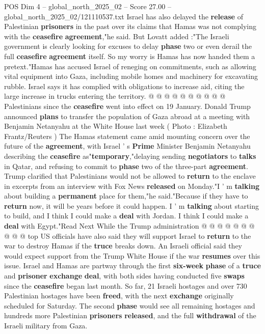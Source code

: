 \begin{textsample}{POS Dim 4 – global\_north\_2025\_02 – Score 27.00 – global\_north\_2025\_02/121110537.txt}
Israel has also delayed the \textbf{release} of Palestinian \textbf{prisoners} in the past over its claims that Hamas was not complying with the \textbf{ceasefire} \textbf{agreement},"he said.
But Lovatt added :"The Israeli government is clearly looking for excuses to delay \textbf{phase} two or even derail the full \textbf{ceasefire} \textbf{agreement} itself.
So my worry is Hamas has now handed them a pretext."Hamas has accused Israel of reneging on commitments, such as allowing vital equipment into Gaza, including mobile homes and machinery for excavating rubble.
Israel says it has complied with obligations to increase aid, citing the large increase in trucks entering the territory. @ @ @ @ @ @ @ @ @ @ Palestinians since the \textbf{ceasefire} went into effect on 19 January.
Donald Trump announced \textbf{plans} to transfer the population of Gaza abroad at a meeting with Benjamin Netanyahu at the White House last week ( Photo : Elizabeth Frantz/Reuters ) The Hamas statement came amid mounting concern over the future of the \textbf{agreement}, with Israel ' s \textbf{Prime} Minister Benjamin Netanyahu describing the \textbf{ceasefire} as"\textbf{temporary},"delaying sending \textbf{negotiators} to \textbf{talks} in Qatar, and refusing to commit to \textbf{phase} two of the three-part \textbf{agreement}.
Trump clarified that Palestinians would not be allowed to \textbf{return} to the enclave in excerpts from an interview with Fox News \textbf{released} on Monday."I ' m \textbf{talking} about building a \textbf{permanent} place for them,"he said."Because if they have to \textbf{return} now, it will be years before it could happen.
I ' m \textbf{talking} about starting to build, and I think I could make a \textbf{deal} with Jordan.
I think I could make a \textbf{deal} with Egypt."Read Next While the Trump administration @ @ @ @ @ @ @ @ @ @ top US officials have also said they will support Israel to \textbf{return} to the war to destroy Hamas if the \textbf{truce} breaks down.
An Israeli official said they would expect support from the Trump White House if the war \textbf{resumes} over this issue.
Israel and Hamas are partway through the first \textbf{six-week} \textbf{phase} of a \textbf{truce} and \textbf{prisoner} \textbf{exchange} \textbf{deal}, with both sides having conducted five \textbf{swaps} since the \textbf{ceasefire} began last month.
So far, 21 Israeli hostages and over 730 Palestinian hostages have been \textbf{freed}, with the next \textbf{exchange} originally scheduled for Saturday.
The second \textbf{phase} would see all remaining hostages and hundreds more Palestinian \textbf{prisoners} \textbf{released}, and the full \textbf{withdrawal} of the Israeli military from Gaza.

\end{textsample}

